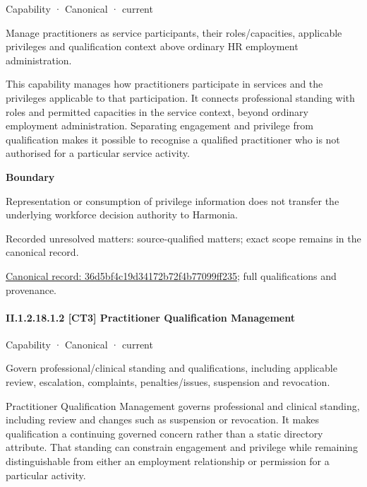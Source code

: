 \label{element:36d5bf4c19d34172b72f4b77099ff235}
{\small Capability · Canonical · current}\par

Manage practitioners as service participants, their roles/capacities, applicable privileges and qualification context above ordinary HR employment administration.



This capability manages how practitioners participate in services and the privileges applicable to that participation. It connects professional standing with roles and permitted capacities in the service context, beyond ordinary employment administration. Separating engagement and privilege from qualification makes it possible to recognise a qualified practitioner who is not authorised for a particular service activity.



\textbf{Boundary}



Representation or consumption of privilege information does not transfer the underlying workforce decision authority to Harmonia.


{\small Recorded unresolved matters: source-qualified matters; exact scope remains in the canonical record.}\par
{\footnotesize \href{../../../../continuum/strategy/capability/36d5bf4c19d34172b72f4b77099ff235.md}{Canonical record: 36d5bf4c19d34172b72f4b77099ff235}; full qualifications and provenance.}\par
\paragraph*{II.1.2.18.1.2 [CT3] Practitioner Qualification Management}
\label{navigation:II.1.2.18.1.2}

\label{element:279bab5de1b74c17a5ee2db5cae8d385}
{\small Capability · Canonical · current}\par

Govern professional/clinical standing and qualifications, including applicable review, escalation, complaints, penalties/issues, suspension and revocation.



Practitioner Qualification Management governs professional and clinical standing, including review and changes such as suspension or revocation. It makes qualification a continuing governed concern rather than a static directory attribute. That standing can constrain engagement and privilege while remaining distinguishable from either an employment relationship or permission for a particular activity.



